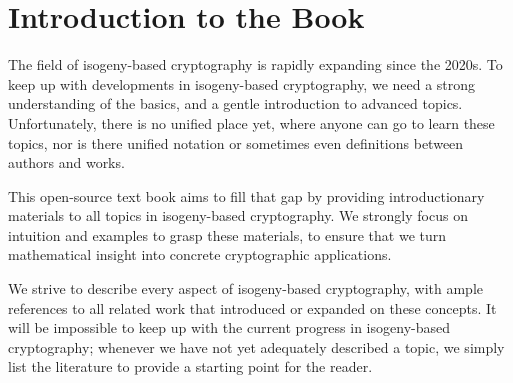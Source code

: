 \chapter*{Introduction to the Book}

The field of isogeny-based cryptography is rapidly expanding since the 2020s.
To keep up with developments in isogeny-based cryptography, we need a strong understanding
of the basics, and a gentle introduction to advanced topics. Unfortunately, there is no
unified place yet, where anyone can go to learn these topics, nor is there unified notation
or sometimes even definitions between authors and works.

This open-source text book aims to fill that gap by providing introductionary materials
to all topics in isogeny-based cryptography. We strongly focus on intuition and examples to
grasp these materials, to ensure that we turn mathematical insight into concrete cryptographic
applications. 

We strive to describe every aspect of isogeny-based cryptography, with ample references to all
related work that introduced or expanded on these concepts. It will be impossible to keep up
with the current progress in isogeny-based cryptography; whenever we have not yet adequately
described a topic, we simply list the literature to provide a starting point for the reader.